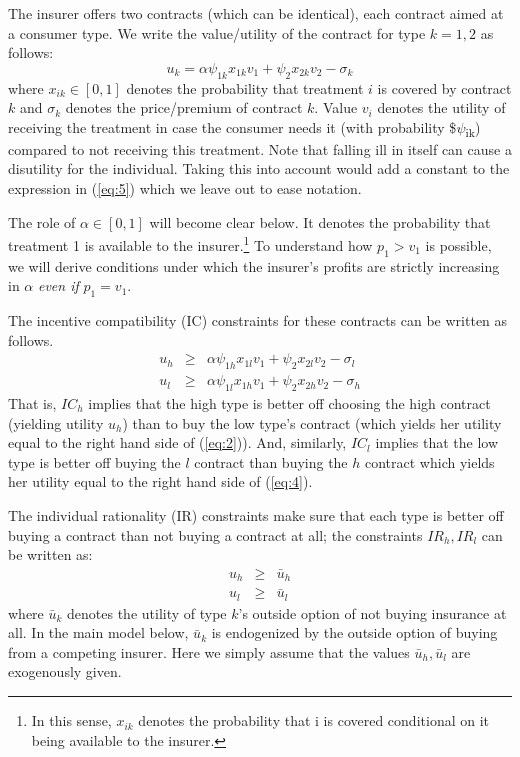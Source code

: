\documentclass[12pt,english,a4paper]{article}
\begin{document}
The insurer offers two contracts (which can be identical), each contract aimed at a consumer type. We write the value/utility of the contract for type \(k=1,2\) as follows:
\begin{equation}
\label{eq:5}
u_{k} = \alpha \psi_{1k} x_{1k} v_1 + \psi_{2} x_{2k} v_2 - \sigma_k
\end{equation}
where \(x_{ik} \in [0,1]\) denotes the probability that treatment \(i\) is covered by contract \(k\) and \(\sigma_k\) denotes the price/premium of contract \(k\). Value \(v_i\) denotes the utility of receiving the treatment in case the consumer needs it (with probability \$\(\psi\)\textsubscript{ik}) compared to not receiving this treatment. Note that falling ill in itself can cause a disutility for the individual. Taking this into account would add a constant to the expression in (\ref{eq:5}) which we leave out to ease notation.

The role of \(\alpha \in [0,1]\) will become clear below. It denotes the probability that treatment 1 is available to the insurer.\footnote{In this sense, \(x_{ik}\) denotes the probability that i is covered conditional on it being available to the insurer.} To understand how \(p_1 > v_1\) is possible, we will derive conditions under which the insurer's profits are strictly increasing in \(\alpha\) \emph{even if} \(p_1 = v_1\).

The incentive compatibility (IC) constraints for these contracts can be written as follows.
\begin{eqnarray}
\label{eq:2}
u_h &\geq&  \alpha \psi_{1h} x_{1l} v_1 + \psi_{2} x_{2l} v_2 - \sigma_{l} \\
\label{eq:4}
u_l &\geq&   \alpha \psi_{1l} x_{1h} v_1 + \psi_{2} x_{2h} v_2 - \sigma_h
\end{eqnarray}
That is, \(IC_h\) implies that the high type is better off choosing the high contract (yielding utility \(u_h\)) than to buy the low type's contract (which yields her utility equal to the right hand side of (\ref{eq:2})). And, similarly, \(IC_l\) implies that the low type is better off buying the \(l\) contract than buying the \(h\) contract which yields her utility equal to the right hand side of (\ref{eq:4}).

The individual rationality (IR) constraints make sure that each type is better off buying a contract than not buying a contract at all; the constraints \(IR_h, IR_l\) can be written as:
\begin{eqnarray}
\label{eq:2IR}
u_h &\geq&  \bar u_h \\
\label{eq:4IR}
u_l &\geq&  \bar u_l
\end{eqnarray}
where \(\bar u_k\) denotes the utility of type \(k\)'s outside option of not buying insurance at all. In the main model below, \(\bar u_k\) is endogenized by the outside option of buying from a competing insurer. Here we simply assume that the values \(\bar u_h, \bar u_l\) are exogenously given.
\end{document}
